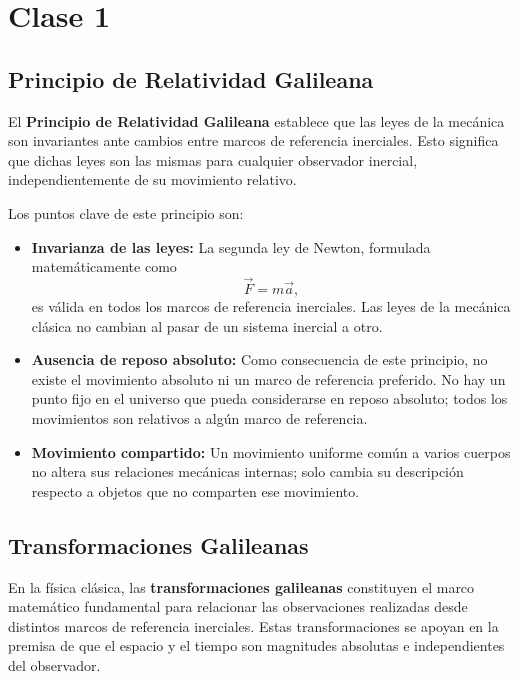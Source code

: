 \chapter{Clase 1}

\section{Principio de Relatividad Galileana}

El \textbf{Principio de Relatividad Galileana} establece que las leyes de la mecánica son invariantes ante cambios entre marcos de referencia inerciales. Esto significa que dichas leyes son las mismas para cualquier observador inercial, independientemente de su movimiento relativo.

Los puntos clave de este principio son:

\begin{itemize}
    \item \textbf{Invarianza de las leyes:} La segunda ley de Newton, formulada matemáticamente como
    \[
        \vec{F}=m\vec{a},
    \]
    es válida en todos los marcos de referencia inerciales. Las leyes de la mecánica clásica no cambian al pasar de un sistema inercial a otro.

    \item \textbf{Ausencia de reposo absoluto:} Como consecuencia de este principio, no existe el movimiento absoluto ni un marco de referencia preferido. No hay un punto fijo en el universo que pueda considerarse en reposo absoluto; todos los movimientos son relativos a algún marco de referencia.

    \item \textbf{Movimiento compartido:} Un movimiento uniforme común a varios cuerpos no altera sus relaciones mecánicas internas; solo cambia su descripción respecto a objetos que no comparten ese movimiento.
\end{itemize}

\section{Transformaciones Galileanas}

En la física clásica, las \textbf{transformaciones galileanas} constituyen el marco matemático fundamental para relacionar las observaciones realizadas desde distintos marcos de referencia inerciales. Estas transformaciones se apoyan en la premisa de que el espacio y el tiempo son magnitudes absolutas e independientes del observador.

